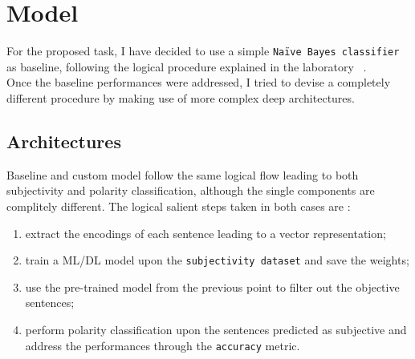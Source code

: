 
\vspace{-0.25cm}
\section{Model}
\label{sec:model}
For the proposed task, I have decided to use a simple \texttt{Na\"{i}ve Bayes classifier} as baseline, following the logical procedure explained in the  laboratory 
~\cite{lab11}.\\
Once the baseline performances were addressed, I tried to devise a completely different procedure by making use of more complex deep architectures. \\

\vspace{-0.5cm}
\subsection{Architectures}
Baseline and custom model follow the same logical flow leading to both subjectivity and polarity classification, although the single components are complitely different.
The logical salient steps taken in both cases are :
\begin{enumerate}
    \item extract the encodings of each sentence leading to a vector representation;
    \item train a ML/DL model upon the \texttt{subjectivity dataset} and save the weights;
    \item use the pre-trained model from the previous point to filter out the objective sentences;
    \item perform polarity classification upon the sentences predicted as subjective and address the performances through the \texttt{accuracy} metric.
\end{enumerate}

